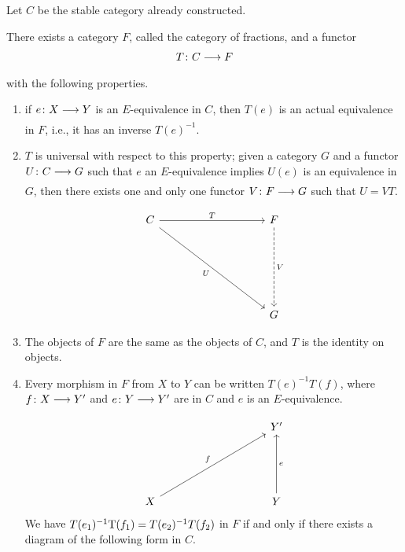 \documentclass[../main]{subfiles}
\begin{document}
Let $C$ be the stable category already constructed.
\begin{theorem} \label{thm:p3ch14.1}
There exists a category $F$, called the category of fractions, and a functor
\[
  T\colon C \lar{} F 
\] with the following properties.

\begin{enumerate}[label=(\roman*)]
  \item if $e\colon X \lar{} Y $ is an $E$-equivalence in $C$, then  $T (e)$ is an actual equivalence in $F$, i.e., it has an inverse  $T (e)^{-1}$.
  \item $T$ is universal with respect to this property; given a category $G$ and a functor $U\colon C \lar{} G$ such that $e$ an $E$-equivalence implies $U(e)$ is an equivalence in $G$, then there exists one and only one functor $V\colon F \lar{} G$ such that $U=VT$.
\[\begin{tikzcd}
	C &&&& F \\
	\\
	\\
	\\
	&&&& G
	\arrow["T", from=1-1, to=1-5]
	\arrow["U"', from=1-1, to=5-5]
	\arrow["V", dashed, from=1-5, to=5-5]
\end{tikzcd}\]
\item The objects of $F$ are the same as the objects of $C$, and  $T$ is the identity on objects.
\item Every morphism in $F$ from $X$ to  $Y$ can be written  $T (e)^{-1}T (f)$, where $f\colon X \lar{} Y'  $ and $e\colon Y \lar{} Y'  $ are in $C$ and  $e$ is an $E$-equivalence. \\
  \[\begin{tikzcd}
	&&&& {Y'} \\
	\\
	\\
	X &&&& Y
	\arrow["f", from=4-1, to=1-5]
	\arrow["e"', from=4-5, to=1-5]
\end{tikzcd}\]
We have $T (e_1)^{-1}\mathrm{T }(f_1)=T (e_2)^{-1}T (f_2)$ in $F$ if and only if there exists a diagram of the following form in $C$. 


\end{enumerate}
\end{theorem}
\end{document}
